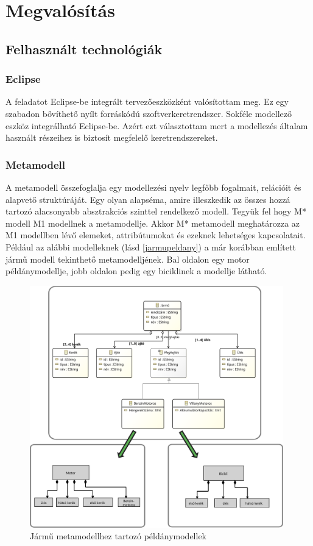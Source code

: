 \chapter{Megvalósítás}\label{chapter:realization}
\section{Felhasznált technológiák}
\subsection{Eclipse}
A feladatot Eclipse-be \cite{Eclipse} integrált tervezőeszközként valósítottam meg. Ez egy szabadon bővíthető nyílt forráskódú szoftverkeretrendszer. Sokféle modellező eszköz integrálható  Eclipse-be. Azért ezt választottam mert a modellezés általam használt részeihez is biztosít megfelelő keretrendszereket.
\subsection{Metamodell}
A metamodell összefoglalja egy modellezési nyelv legfőbb fogalmait, relációit és alapvető struktúráját. Egy olyan alapséma, amire illeszkedik az összes hozzá tartozó alacsonyabb absztrakciós szinttel rendelkező modell. 
Tegyük fel hogy M* modell M1 modellnek a metamodellje.
Akkor M* metamodell meghatározza az M1 modellben lévő elemeket, attribútumokat és ezeknek lehetséges kapcsolatait. Például az alábbi modelleknek (lásd \autoref{jarmupeldany}) a már korábban említett jármű modell tekinthető metamodelljének. Bal oldalon egy motor példánymodellje, jobb oldalon pedig egy biciklinek a modellje látható.

\begin{figure}[!ht]
	\centering
	\includegraphics[width=110mm]{figures/meta.pdf}
	\caption{Jármű metamodellhez tartozó példánymodellek} 
	\label{jarmupeldany}
\end{figure}

